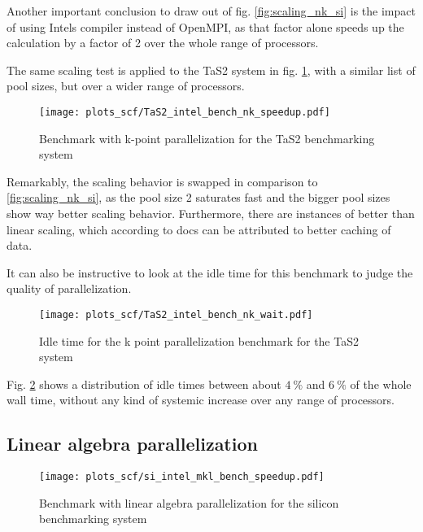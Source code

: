 \documentclass[main.tex]{subfiles}
\begin{document}
Another important conclusion to draw out of fig. \ref{fig:scaling_nk_si} is the impact of using Intels compiler instead of OpenMPI, as that factor alone speeds up the calculation by a factor of 2 over the whole range of processors.

The same scaling test is applied to the TaS2 system in fig. \ref{fig:scaling_nk_tas2}, with a similar list of pool sizes, but over a wider range of processors.

\begin{figure}[ht!]
    \centering
    \texttt{[image: plots\_scf/TaS2\_intel\_bench\_nk\_speedup.pdf]}
    \caption{Benchmark with k-point parallelization for the TaS2 benchmarking system}
    \label{fig:scaling_nk_tas2}
\end{figure}

Remarkably, the scaling behavior is swapped in comparison to \ref{fig:scaling_nk_si}, as the pool size 2 saturates fast and the bigger pool sizes show way better scaling behavior.
Furthermore, there are instances of better than linear scaling, which according to \QE docs can be attributed to better caching of data.

It can also be instructive to look at the idle time for this benchmark to judge the quality of parallelization. 

\begin{figure}[ht!]
    \centering
    \texttt{[image: plots\_scf/TaS2\_intel\_bench\_nk\_wait.pdf]}
    \caption{Idle time for the k point parallelization benchmark for the TaS2 system}
    \label{fig:scaling_nk_tas2_wait}
\end{figure}

Fig. \ref{fig:scaling_nk_tas2_wait} shows a distribution of idle times between about \(\SI{4}{\percent}\) and \(\SI{6}{\percent}\) of the whole wall time, without any kind of systemic increase over any range of processors.

\subsection{Linear algebra parallelization}

\begin{figure}[ht!]
    \centering
    \texttt{[image: plots\_scf/si\_intel\_mkl\_bench\_speedup.pdf]}
    \caption{Benchmark with linear algebra parallelization for the silicon benchmarking system}
    \label{fig:scaling_nd_si}
\end{figure}
\end{document}
